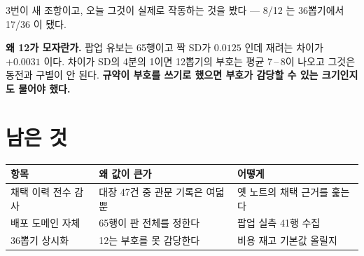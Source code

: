 \documentclass[11pt]{article}
\begin{document}
3번이 새 조항이고, 오늘 그것이 실제로 작동하는 것을 봤다 --- 8/12 는
36뽑기에서 17/36 이 됐다.

\textbf{왜 12가 모자란가.} 팝업 유보는 65행이고 짝 SD가 $0.0125$ 인데
재려는 차이가 $+0.0031$ 이다. 차이가 SD의 4분의 1이면 12뽑기의 부호는
평균 7\,--\,8이 나오고 그것은 동전과 구별이 안 된다. \textbf{규약이 부호를
쓰기로 했으면 부호가 감당할 수 있는 크기인지도 물어야 했다.}

\section{남은 것}

\begin{center}
\begin{tabular}{lll}
\hline
항목 & 왜 값이 큰가 & 어떻게 \\
\hline
채택 이력 전수 감사 & 대장 47건 중 관문 기록은 여덟뿐 & 옛 노트의 채택 근거를 훑는다 \\
배포 도메인 자체 & 65행이 판 전체를 정한다 & 팝업 실측 41행 수집 \\
36뽑기 상시화 & 12는 부호를 못 감당한다 & 비용 재고 기본값 올릴지 \\
\hline
\end{tabular}
\end{center}
\end{document}
